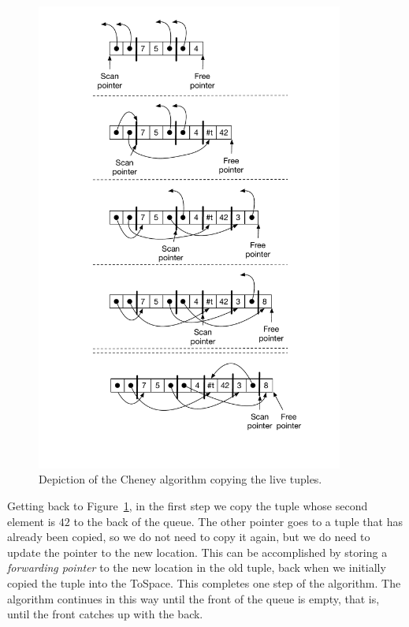 \documentclass[11pt]{book}
\begin{document}
{\begin{figure}[tbp]
\centering \includegraphics[width=0.9\textwidth]{figs/cheney}
\caption{Depiction of the Cheney algorithm copying the live tuples.}
\label{fig:cheney}
\end{figure}

Getting back to Figure~\ref{fig:cheney}, in the first step we copy the
tuple whose second element is $42$ to the back of the queue. The other
pointer goes to a tuple that has already been copied, so we do not
need to copy it again, but we do need to update the pointer to the new
location. This can be accomplished by storing a \emph{forwarding
pointer} to the new location in the old tuple, back when we initially
copied the tuple into the ToSpace. This completes one step of the
algorithm. The algorithm continues in this way until the front of the
queue is empty, that is, until the front catches up with the back.


}
\end{document}
